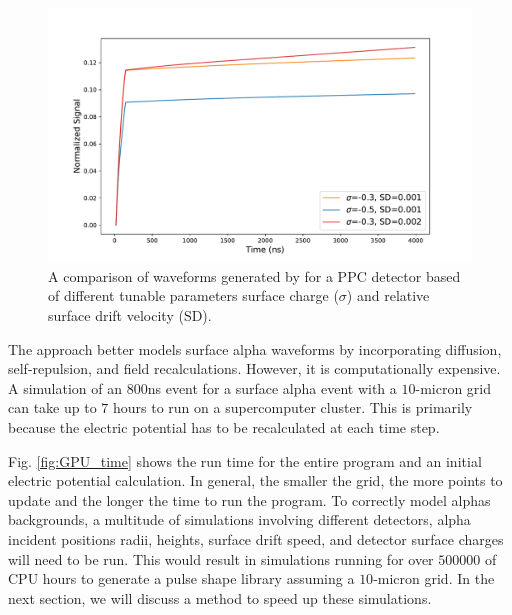 \begin{figure}
    \includegraphics[trim={0.1cm 0.3cm 1.3cm 0.3cm},clip,width=0.99\linewidth]{ch3/figs/wf_comp.pdf}
    \caption{A comparison of waveforms generated by {\tdsim} for a {\Ltwo} PPC detector based of different tunable parameters surface charge ($\sigma$) and relative surface drift velocity (SD).}
    \label{fig:wf_comp}
\end{figure}

The {\tdsim} approach better models surface alpha waveforms by incorporating diffusion, self-repulsion, and field recalculations. However, it is computationally expensive. A simulation of an $800$ns event for a surface alpha event with a $10$-micron grid can take up to $7$ hours to run on a supercomputer cluster. This is primarily because the electric potential has to be recalculated at each time step.


Fig. \ref{fig:GPU_time} shows the run time for the entire program and an initial electric potential calculation. In general, the smaller the grid, the more points to update and the longer the time to run the program. To correctly model alphas backgrounds, a multitude of simulations involving different detectors, alpha incident positions radii, heights, surface drift speed, and detector surface charges will need to be run. This would result in simulations running for over $500000$ of CPU hours to generate a pulse shape library assuming a $10$-micron grid. In the next section, we will discuss a method to speed up these simulations.


